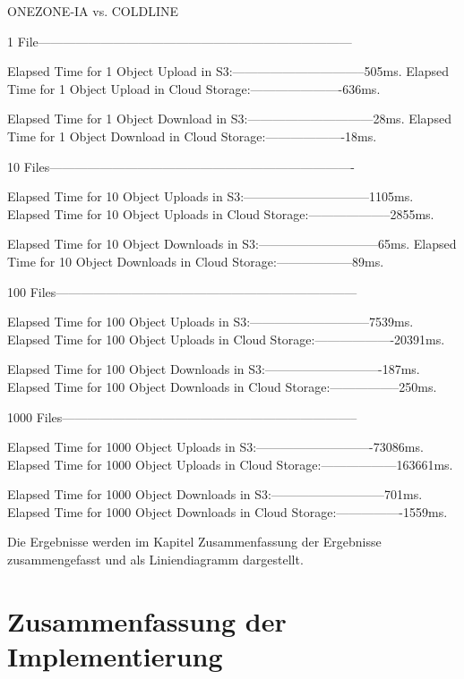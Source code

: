\begin{code}
ONEZONE-IA vs. COLDLINE

1 File---------------------------------------------------------------------------

Elapsed Time for 1  Object Upload in S3:--------------------------------505ms.
Elapsed Time for 1 Object Upload in Cloud Storage:----------------------636ms.

Elapsed Time for 1 Object Download in S3:------------------------------28ms.
Elapsed Time for 1 Object Download in Cloud Storage:-------------------18ms.

10 Files-------------------------------------------------------------------------

Elapsed Time for 10  Object Uploads in S3:------------------------------1105ms.
Elapsed Time for 10 Object Uploads in Cloud Storage:--------------------2855ms.

Elapsed Time for 10 Object Downloads in S3:-----------------------------65ms.
Elapsed Time for 10 Object Downloads in Cloud Storage:------------------89ms.

100 Files------------------------------------------------------------------------

Elapsed Time for 100  Object Uploads in S3:-----------------------------7539ms.
Elapsed Time for 100 Object Uploads in Cloud Storage:-------------------20391ms.

Elapsed Time for 100 Object Downloads in S3:----------------------------187ms.
Elapsed Time for 100 Object Downloads in Cloud Storage:-----------------250ms.

1000 Files-----------------------------------------------------------------------

Elapsed Time for 1000  Object Uploads in S3:----------------------------73086ms.
Elapsed Time for 1000 Object Uploads in Cloud Storage:------------------163661ms.

Elapsed Time for 1000 Object Downloads in S3:---------------------------701ms.
Elapsed Time for 1000 Object Downloads in Cloud Storage:----------------1559ms.
\end{code}


Die Ergebnisse werden im Kapitel Zusammenfassung der Ergebnisse zusammengefasst und als Liniendiagramm dargestellt.

\newpage

\section{Zusammenfassung der Implementierung}

